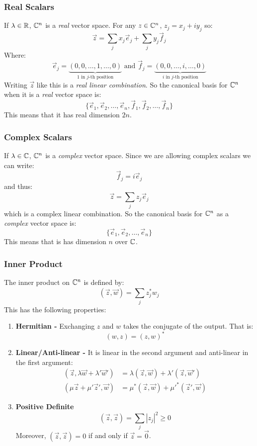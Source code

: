 \documentclass[../main.tex]{subfiles}
\begin{document}
\subsubsection{Real Scalars}
If $\lambda \in \mathbb{R}$, $\mathbb{C}^{n}$ is a \textit{real} vector space.
For any $z \in \mathbb{C}^{n}$, $z_j = x_j + iy_j$ so:
\[
  \vec{z} = \sum_{j}^{} x_j \vec{e}_j + \sum_{j}^{} y_j \vec{f}_j
\]
Where:
\[
  \vec{e}_j = \underbrace{(0, 0, \ldots, 1, \ldots, 0)}_{\text{1 in $j$-th position}} \text{ and }
  \vec{f}_j = \underbrace{(0, 0, \ldots, i, \ldots, 0)}_{\text{$i$ in $j$-th position}}
\]
Writing $\vec{z}$ like this is a \textit{real linear combination}.
So the canonical basis for $\mathbb{C}^{n}$ when it is a \textit{real} vector space is:
\[
  \{\vec{e}_1, \vec{e}_2, \ldots, \vec{e}_n, \vec{f}_1, \vec{f}_2, \ldots, \vec{f}_n\}
\]
This means that it has real dimension $2n$.
\subsubsection{Complex Scalars}
If $\lambda \in \mathbb{C}$, $\mathbb{C}^{n}$ is a \textit{complex} vector space.
Since we are allowing complex scalars we can write:
\[
  \vec{f}_j = i \vec{e}_j
\]
and thus:
\[
  \vec{z} = \sum_{j}^{} z_j \vec{e}_j
\]
which is a complex linear combination.
So the canonical basis for $\mathbb{C}^{n}$ as a \textit{complex} vector space is:
\[
  \{\vec{e}_1, \vec{e}_2, \ldots, \vec{e}_n\}
\]
This means that is has dimension $n$ over $\mathbb{C}$.
\subsubsection{Inner Product}
The inner product on $\mathbb{C}^{n}$ is defined by:
\[
  (\vec{z}, \vec{w}) = \sum_{j}^{} z^{*}_{j} w_j
\]
This has the following properties:
\begin{enumerate}
  \item \textbf{Hermitian -} Exchanging $z$ and $w$ takes the conjugate of the output. That is:
    \[
      (w, z) = (z, w)^{*}
    \]
  \item \textbf{Linear/Anti-linear -} It is linear in the second argument and anti-linear in the first argument:
    \begin{align*}
      (\vec{z}, \lambda \vec{w} + \lambda' \vec{w}') &= \lambda(\vec{z}, \vec{w}) + \lambda'(\vec{z}, \vec{w}') \\
      (\mu \vec{z} + \mu' \vec{z}', \vec{w}) &= \mu^{*}(\vec{z}, \vec{w}) + {\mu'}^{*}(\vec{z}', \vec{w})
    \end{align*}
  \item \textbf{Positive Definite}
    \[
      (\vec{z}, \vec{z}) = \sum_{j} |z_j|^2 \geq 0
    \]
    Moreover, $(\vec{z}, \vec{z}) = 0$ if and only if $\vec{z} = \vec{0}$.
\end{enumerate}
\end{document}
